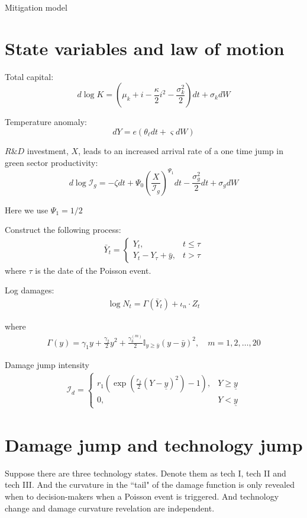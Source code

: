 \documentclass[11pt]{article}
\begin{document}
	\begin{center}
	{\Large Mitigation model}	
	\end{center}
	
	\section{State variables and law of motion}
	
	Total capital:
	$$
	d \log K = (\mu_k + i - \frac{\kappa}{2} i^2 - \frac{\sigma_k^2}{2}) dt + \sigma_k dW
	$$
	
	Temperature anomaly:
	$$
	d Y = e(\theta_\ell dt + \varsigma dW)
	$$
	
	$R\& D$ investment, $X$, leads to an increased arrival rate of a one time jump in green sector productivity:
	$$
	d\log \mathcal{I}_g = - \zeta dt + \Psi_0 (\frac{X}{\mathcal{I}_g})^{\Psi_1} dt - \frac{\sigma_g^2}{2} dt + \sigma_g dW 
	$$
	
	Here we use $\Psi_1 = 1/2$
	
	Construct the following process:
	\begin{align*}
		\bar{Y}_t = \begin{cases}
			Y_t, & t \le \tau\\
			Y_t - Y_\tau + \bar{y}, & t > \tau
		\end{cases}
	\end{align*}
where $\tau$ is the date of the Poisson event.
	
	Log damages: 
	\begin{align*}
		\log N_t = \Gamma(\bar{Y}_t) + \iota_n \cdot Z_t
	\end{align*}

where
\begin{align*}
	\Gamma(y) = \gamma_1 y + \frac{\gamma_2}{2} y^2 + \frac{\gamma_3^{(m)}}{2} \mathbb{I}_{y \ge \bar{y}} (y - \bar{y})^2, \quad m = 1, 2, \dots, 20
\end{align*}

Damage jump intensity
\begin{align*}
	\mathcal{I}_d = \begin{cases}
		r_1 \left(\exp(\frac{r_2}{2} (Y - \underline{y})^2 ) - 1\right), & Y \ge \underline{y}\\
		0, & Y < \underline{y}
	\end{cases}
\end{align*}
	
	\section{Damage jump and technology jump}
	Suppose there are three technology states. Denote them as tech I, tech II and tech III. 
	And the curvature in the ``tail" of the damage function is only revealed when to decision-makers when a Poisson event is triggered. And technology change and damage curvature revelation are independent.
	
\end{document}
